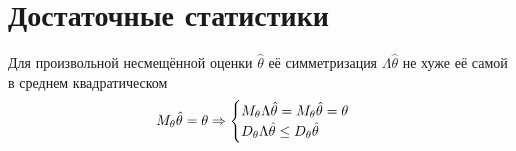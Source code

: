 \chapter{Достаточные статистики}
\begin{lemma}
    Для произвольной несмещённой оценки $\hat{\theta}$
    её симметризация $\Lambda{\hat{\theta}}$
    не хуже её самой в среднем квадратическом
    \begin{align*}
    M_{\theta} \hat{\theta}
        =\theta
    \Rightarrow
        \begin{cases}
            M_{\theta} \Lambda{\hat{\theta}}
                =M_{\theta} \hat{\theta}
                =\theta\\
            D_{\theta} \Lambda{\hat{\theta}}
                \le D_{\theta} \hat{\theta}
        \end{cases}
    \end{align*}
\end{lemma}
